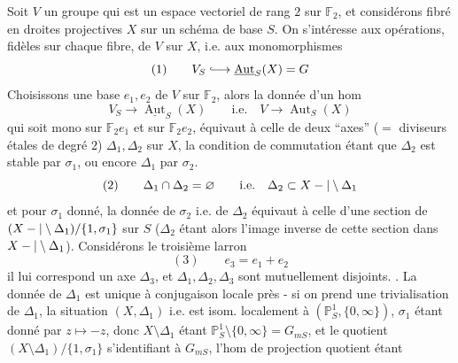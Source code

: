 Soit $V$ un groupe qui est un espace vectoriel de rang $2$ sur $\mathbb F_2$, et considérons   fibré en droites projectives $X$ sur un schéma de base $S$. On s'intéresse aux opérations, fidèles sur chaque fibre, de $V$ sur $X$, i.e. aux monomorphismes
\[
(1)\qquad V_S\lhook\joinrel\longrightarrow\underline{\operatorname{Aut}}_S(X)=G
\]
Choisissons une base $e_1,e_2$ de $V$ sur $\mathbb F_2$, alors la donnée d'un hom
\[
V_S\longrightarrow\underline{\operatorname{Aut}}_S(X)\qquad\text{i.e.}\quad V\longrightarrow\operatorname{Aut}_S(X)
\]
qui soit mono sur $\mathbb F_2e_1$ et sur $\mathbb F_2e_2$, équivaut à celle de deux  ``axes'' ($=$ diviseurs étales de degré $2$) $\Delta_1,\Delta_2$ sur $X$, la condition de commutation étant que $\Delta_2$ est stable par $\sigma_1$, ou encore $\Delta_1$  par $\sigma_2$.
\[
(2)\qquad\Delta_1\cap\Delta_2=\varnothing\qquad\text{i.e.}\quad\Delta_2\subset X-|\setminus\Delta_1
\]
et pour $\sigma_1$  donné, la donnée de  $\sigma_2$ i.e. de $\Delta_2$ équivaut à celle d'une section de  $(X-|\setminus\Delta_1)/\{1,\sigma_1\}$ sur $S$ ($\Delta_2$ étant alors l'image inverse de cette section dans $X-|\setminus\Delta_1$). Considérons le troisième larron
\[
(3)\qquad e_3=e_1+e_2
\]
il lui correspond un axe $\Delta_3$, et $\Delta_1,\Delta_2,\Delta_3$ sont mutuellement disjoints.
. La donnée de $\Delta_1$ est unique à conjugaison locale près - si on prend une trivialisation de  $\Delta_1$,  la situation $(X,\Delta_1)$ i.e.  est isom. localement à $(\mathbb P^1_S,\{0,\infty\})$, $\sigma_1$ étant donné par $z\longmapsto-z$, donc $X\setminus\Delta_1$ étant  $\mathbb P^1_S\setminus\{0,\infty\}=G_{mS}$, et le quotient $(X\setminus\Delta_1)/\{1,\sigma_1\}$ s'identifiant à $G_{mS}$, l'hom de projection quotient étant
